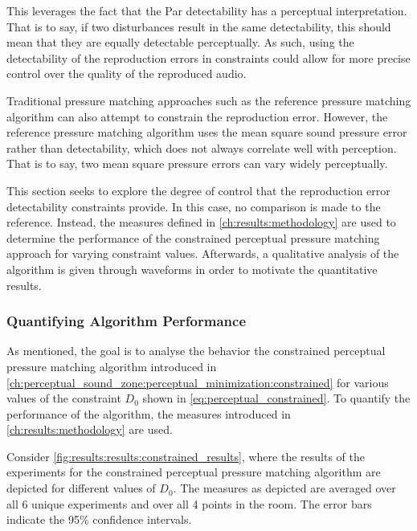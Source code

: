 This leverages the fact that the Par detectability has a perceptual interpretation.
That is to say, if two disturbances result in the same detectability, this should mean that they are equally detectable 
perceptually.
As such, using the detectability of the reproduction errors in constraints could allow for more precise control over the 
quality of the reproduced audio.

Traditional pressure matching approaches such as the reference pressure matching algorithm can also attempt to constrain the 
reproduction error.
However, the reference pressure matching algorithm uses the mean square sound pressure error rather than detectability,
which does not always correlate well with perception.
That is to say, two mean square pressure errors can vary widely perceptually.

This section seeks to explore the degree of control that the reproduction error detectability constraints provide.
In this case, no comparison is made to the reference.
Instead, the measures defined in \autoref{ch:results:methodology} are used to determine the performance of the 
constrained perceptual pressure matching approach for varying constraint values.
Afterwards, a qualitative analysis of the algorithm is given through waveforms in order to motivate the quantitative results.

\subsubsection*{Quantifying Algorithm Performance}

As mentioned, the goal is to analyse the behavior the constrained perceptual pressure matching algorithm
introduced in \autoref{ch:perceptual_sound_zone:perceptual_minimization:constrained} for various values of the 
constraint $D_0$ shown in \autoref{eq:perceptual_constrained}. 
To quantify the performance of the algorithm, the measures introduced in \autoref{ch:results:methodology} are used.

Consider \autoref{fig:results:results:constrained_results}, where the results of the 
experiments for the constrained perceptual pressure matching algorithm are depicted for different values of $D_0$. 
The measures as depicted are averaged over all 6 unique experiments and over all 4 points in the room. 
The error bars indicate the 95\% confidence intervals.

